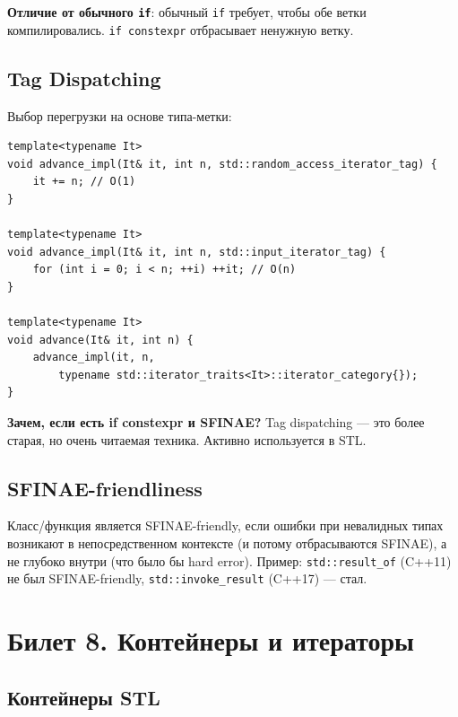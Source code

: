 \documentclass[12pt,a4paper]{article}
\begin{document}
\textbf{Отличие от обычного \texttt{if}}: обычный \texttt{if} требует, чтобы обе ветки компилировались. \texttt{if constexpr} отбрасывает ненужную ветку.

\subsection{Tag Dispatching}

Выбор перегрузки на основе типа-метки:
\begin{lstlisting}
template<typename It>
void advance_impl(It& it, int n, std::random_access_iterator_tag) {
    it += n; // O(1)
}

template<typename It>
void advance_impl(It& it, int n, std::input_iterator_tag) {
    for (int i = 0; i < n; ++i) ++it; // O(n)
}

template<typename It>
void advance(It& it, int n) {
    advance_impl(it, n,
        typename std::iterator_traits<It>::iterator_category{});
}
\end{lstlisting}

\textbf{Зачем, если есть if constexpr и SFINAE?} Tag dispatching --- это более старая, но очень читаемая техника. Активно используется в STL.

\subsection{SFINAE-friendliness}

Класс/функция является SFINAE-friendly, если ошибки при невалидных типах возникают в непосредственном контексте (и потому отбрасываются SFINAE), а не глубоко внутри (что было бы hard error). Пример: \texttt{std::result\_of} (C++11) не был SFINAE-friendly, \texttt{std::invoke\_result} (C++17) --- стал.

\section{Билет 8. Контейнеры и итераторы}

\subsection{Контейнеры STL}
\end{document}
